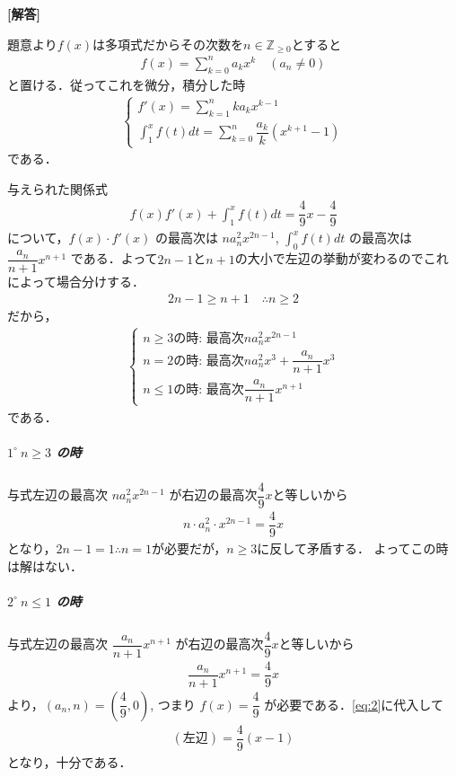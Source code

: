 \documentclass[../../main.tex]{subfiles}
\begin{document}
\begin{oframed}
  
\end{oframed}

{\bf [解答]}

題意より$f(x)$は多項式だからその次数を$n\in\mathbb{Z}_{\ge 0}$とすると
\begin{align}
  f(x) = \sum_{k=0}^{n}a_{k} x^{k} \quad (a_n \ne 0) \label{eq:1}
\end{align}
と置ける．従ってこれを微分，積分した時
\begin{align}
  \begin{cases}
    f'(x) = \sum_{k=1}^{n}k a_{k} x^{k-1} \\
    \int_1^xf(t)dt = \sum_{k=0}^{n} \dfrac{a_{k}}{k}\left(x^{k+1}-1\right)
  \end{cases}
\end{align}
である．

与えられた関係式
\begin{align}
  f(x)f'(x)+\int_1^xf(t)dt=\dfrac{4}{9}x-\dfrac{4}{9} \label{eq:2}
\end{align}
について，$f(x) \cdot f'(x)$ の最高次は $n a_n^2 x^{2n-1}$, $\int_0^x f(t) dt$ の最高次は $\dfrac{a_n}{n+1} x^{n+1}$ である．よって$2n-1$と$n+1$の大小で左辺の挙動が変わるのでこれによって場合分けする．
\begin{align}
  2n-1 \ge n+1 \quad \therefore  n \ge 2
\end{align}
だから，
\begin{align}
  \begin{cases}
    n \ge 3 \text{の時: 最高次} n a_n^2 x^{2n-1} \\
    n = 2 \text{の時: 最高次} n a_n^2 x^{3}+\dfrac{a_n}{n+1}x^{3} \\
    n \le 1 \text{の時: 最高次} \dfrac{a_n}{n+1} x^{n+1}
  \end{cases}
\end{align}
である．

\subparagraph{$1^\circ \ n \ge 3$ の時}

与式左辺の最高次 $n a_n^2 x^{2n-1}$ が右辺の最高次$\dfrac{4}{9}x$と等しいから
\begin{align}
  n \cdot a_n^2 \cdot x^{2n-1} = \dfrac{4}{9} x
\end{align}
となり，$2n-1=1 \therefore n=1$が必要だが，$n \ge 3$に反して矛盾する．
よってこの時は解はない．

\subparagraph{$2^\circ \ n \le 1$ の時}

与式左辺の最高次 $\dfrac{a_n}{n+1} x^{n+1}$ が右辺の最高次$\dfrac{4}{9}x$と等しいから
\begin{align}
  \dfrac{a_n}{n+1} x^{n+1} = \dfrac{4}{9} x
\end{align}
より，$(a_n, n) = \left(\dfrac{4}{9}, 0\right)$, つまり $f(x) = \dfrac{4}{9}$ が必要である．\cref{eq:2}に代入して
\begin{align}
  (\text{左辺}) = \dfrac{4}{9} (x - 1)
\end{align}
となり，十分である．
\end{document}
